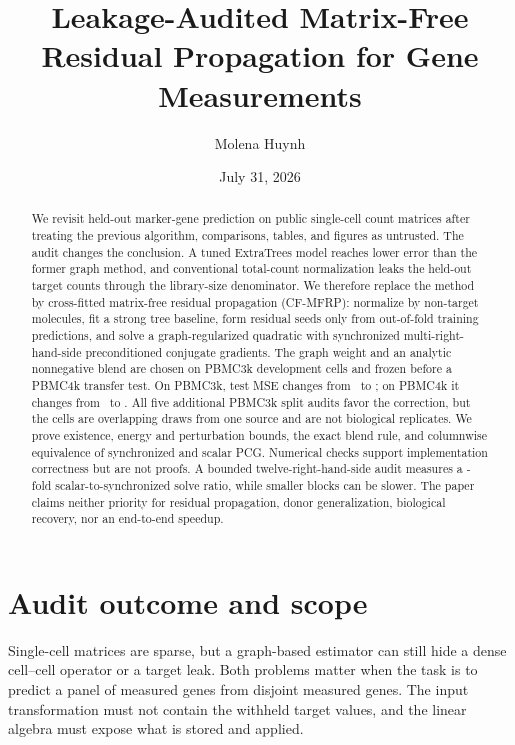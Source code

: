\documentclass[10pt,letterpaper,twoside]{article}
\newcommand{\method}{\textsc{CF-MFRP}}
\begin{document}
\title{Leakage-Audited Matrix-Free Residual Propagation for Gene Measurements}
\author{Molena Huynh}
\date{July 31, 2026}

\maketitle

\begin{abstract}
We revisit held-out marker-gene prediction on public single-cell count matrices
after treating the previous algorithm, comparisons, tables, and figures as
untrusted.  The audit changes the conclusion.  A tuned ExtraTrees model reaches
lower error than the former graph method, and conventional total-count
normalization leaks the held-out target counts through the library-size
denominator.  We therefore replace the method by cross-fitted matrix-free
residual propagation (\method): normalize by non-target molecules, fit a strong
tree baseline, form residual seeds only from out-of-fold training predictions,
and solve a graph-regularized quadratic with synchronized multi-right-hand-side
preconditioned conjugate gradients.  The graph weight and an analytic
nonnegative blend are chosen on PBMC3k development cells and frozen before a
PBMC4k transfer test.  On PBMC3k, test MSE changes from \PrimaryBaseMSE\ to
\PrimaryMethodMSE; on PBMC4k it changes from \ExternalBaseMSE\ to
\ExternalMethodMSE.  All five additional PBMC3k split audits favor the
correction, but the cells are overlapping draws from one source and are not
biological replicates.  We prove existence, energy and perturbation bounds, the
exact blend rule, and columnwise equivalence of synchronized and scalar PCG.
Numerical checks support implementation correctness but are not proofs.  A
bounded twelve-right-hand-side audit measures a \BatchSpeedRatio-fold
scalar-to-synchronized solve ratio, while smaller blocks can be slower.  The
paper claims neither priority for residual propagation, donor generalization,
biological recovery, nor an end-to-end speedup.
\end{abstract}


\section{Audit outcome and scope}

Single-cell matrices are sparse, but a graph-based estimator can still hide a
dense cell--cell operator or a target leak.  Both problems matter when the task
is to predict a panel of measured genes from disjoint measured genes.  The
input transformation must not contain the withheld target values, and the
linear algebra must expose what is stored and applied.
\end{document}

